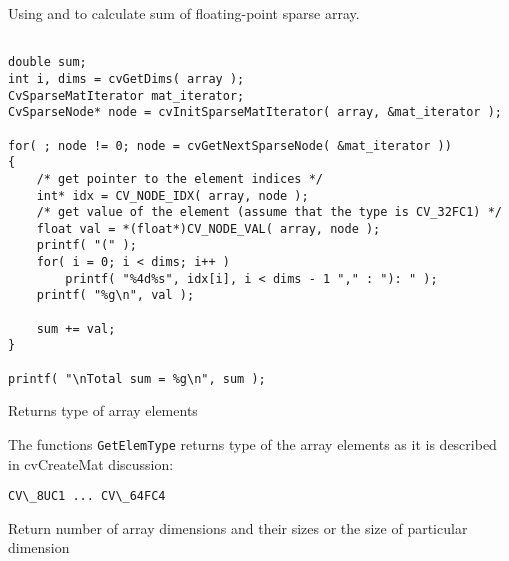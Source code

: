 Using  and  to calculate sum of floating-point sparse array.

\begin{lstlisting}

double sum;
int i, dims = cvGetDims( array );
CvSparseMatIterator mat_iterator;
CvSparseNode* node = cvInitSparseMatIterator( array, &mat_iterator );

for( ; node != 0; node = cvGetNextSparseNode( &mat_iterator ))
{
    /* get pointer to the element indices */
    int* idx = CV_NODE_IDX( array, node );
    /* get value of the element (assume that the type is CV_32FC1) */
    float val = *(float*)CV_NODE_VAL( array, node );
    printf( "(" );
    for( i = 0; i < dims; i++ )
        printf( "%4d%s", idx[i], i < dims - 1 "," : "): " );
    printf( "%g\n", val );

    sum += val;
}

printf( "\nTotal sum = %g\n", sum );

\end{lstlisting}



Returns type of array elements


\begin{description}
\end{description}


The functions \texttt{GetElemType} returns type of the array elements as it is described in cvCreateMat discussion:

\begin{lstlisting}
CV\_8UC1 ... CV\_64FC4
\end{lstlisting}



Return number of array dimensions and their sizes or the size of particular dimension


\begin{description}
\end{description}


